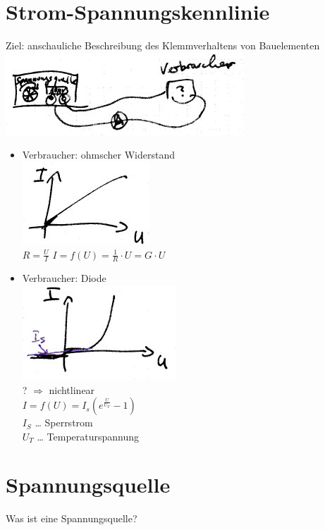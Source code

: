 \section{Strom-Spannungskennlinie}
Ziel: anschauliche Beschreibung des Klemmverhaltens von Bauelementen\\
\includegraphics[scale=.75]{Abbildungen/ABB304}
\begin{itemize}
\item Verbraucher: ohmscher Widerstand\\
\includegraphics[scale=.75]{Abbildungen/ABB305}\\
$R=\frac{U}{I}$
$I=f(U)=\frac{1}{R}\cdot U = G \cdot U$
\item Verbraucher: Diode\\
\includegraphics[scale=.75]{Abbildungen/ABB306}\\
? $\Rightarrow$ nichtlinear\\
$I=f(U)=I_s\left(e^{\frac{U}{U_T}}-1\right)$\\
$I_S$ … Sperrstrom\\
$U_T$ … Temperaturspannung 
\end{itemize}

\section{Spannungsquelle}

Was ist eine Spannungsquelle?

